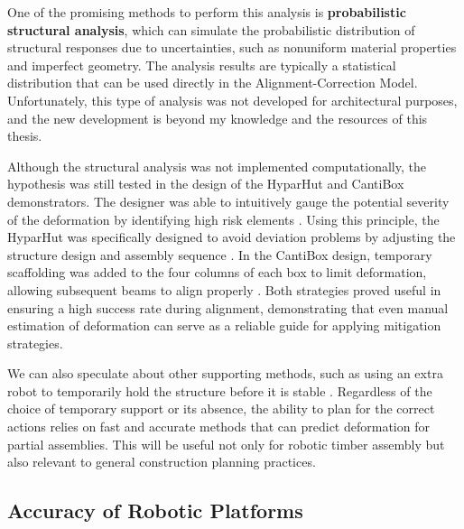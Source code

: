 

One of the promising methods to perform this analysis is \textbf{probabilistic structural analysis}, which can simulate the probabilistic distribution of structural responses due to uncertainties, such as nonuniform material properties and imperfect geometry\parencite{cruseProbabilisticStructuralAnalysis1988, kohlerProbabilisticModelingTimber2007}. The analysis results are typically a statistical distribution that can be used directly in the Alignment-Correction Model. Unfortunately, this type of analysis was not developed for architectural purposes, and the new development is beyond my knowledge and the resources of this thesis. 

Although the structural analysis was not implemented computationally, the hypothesis was still tested in the design of the HyparHut and CantiBox demonstrators. The designer was able to intuitively gauge the potential severity of the deformation by identifying high risk elements . Using this principle, the HyparHut was specifically designed to avoid deviation problems by adjusting the structure design and assembly sequence . In the CantiBox design, temporary scaffolding was added to the four columns of each box to limit deformation, allowing subsequent beams to align properly . Both strategies proved useful in ensuring a high success rate during alignment, demonstrating that even manual estimation of deformation can serve as a reliable guide for applying mitigation strategies. 

We can also speculate about other supporting methods, such as using an extra robot to temporarily hold the structure before it is stable \parencite{paraschoCooperativeRoboticAssembly2019, thomaRoboticFabricationBespoke2018}. Regardless of the choice of temporary support or its absence, the ability to plan for the correct actions relies on fast and accurate methods that can predict deformation for partial assemblies. This will be useful not only for robotic timber assembly but also relevant to general construction planning practices.

\subsection{Accuracy of Robotic Platforms}
\label{subsection:new-hypo-accuracy-of-robotic-platforms}

